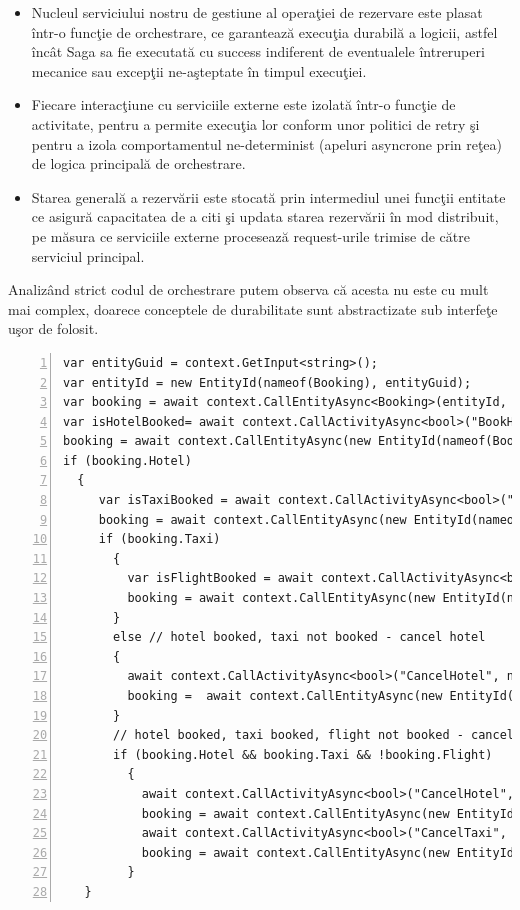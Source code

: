 \documentclass[a4paper,12pt]{report}
\begin{document}
 \begin{itemize}
 \item Nucleul serviciului nostru de gestiune al operaţiei de rezervare este plasat într-o funcţie de orchestrare, ce garantează execuţia durabilă a logicii, astfel încât Saga sa fie executată cu success indiferent de eventualele întreruperi mecanice sau excepţii ne-aşteptate în timpul execuţiei.
 \item Fiecare interacţiune cu serviciile externe este izolată într-o funcţie de activitate, pentru a permite execuţia lor conform unor politici de retry şi pentru a izola comportamentul ne-determinist (apeluri asyncrone prin reţea) de logica principală de orchestrare.
 \item Starea generală a rezervării este stocată prin intermediul unei funcţii entitate ce asigură capacitatea de a citi şi updata starea rezervării în mod distribuit, pe măsura ce serviciile externe procesează request-urile trimise de către serviciul principal.
 \end{itemize}
 \par Analizând strict codul de orchestrare putem observa că acesta nu este cu mult mai complex, doarece conceptele de durabilitate sunt abstractizate sub interfeţe uşor de folosit. 
\begin{lstlisting}[numbers=left]
var entityGuid = context.GetInput<string>();
var entityId = new EntityId(nameof(Booking), entityGuid);
var booking = await context.CallEntityAsync<Booking>(entityId, "Get");
var isHotelBooked= await context.CallActivityAsync<bool>("BookHotel", null);
booking = await context.CallEntityAsync(new EntityId(nameof(Booking), entityGuid),"UpdateHotel", isHotelBooked);
if (booking.Hotel)
  {
     var isTaxiBooked = await context.CallActivityAsync<bool>("BookTaxi", null);
     booking = await context.CallEntityAsync(new EntityId(nameof(Booking), entityGuid),"UpdateTaxi", isTaxiBooked);
     if (booking.Taxi)
       {
         var isFlightBooked = await context.CallActivityAsync<bool>("BookFlight", null);
         booking = await context.CallEntityAsync(new EntityId(nameof(Booking), entityGuid),"UpdateFlight", isFlightBooked);
       }
       else // hotel booked, taxi not booked - cancel hotel
       {
         await context.CallActivityAsync<bool>("CancelHotel", null);
         booking =  await context.CallEntityAsync(new EntityId(nameof(Booking), entityGuid),"UpdateHotel", false);
       }
       // hotel booked, taxi booked, flight not booked - cancel hotel & taxi
       if (booking.Hotel && booking.Taxi && !booking.Flight)
         {
           await context.CallActivityAsync<bool>("CancelHotel", null);
           booking = await context.CallEntityAsync(new EntityId(nameof(Booking), entityGuid),"UpdateHotel", false);
           await context.CallActivityAsync<bool>("CancelTaxi", null);
           booking = await context.CallEntityAsync(new EntityId(nameof(Booking), entityGuid),	"UpdateTaxi", false);
         }
   }
\end{lstlisting}
\end{document}
